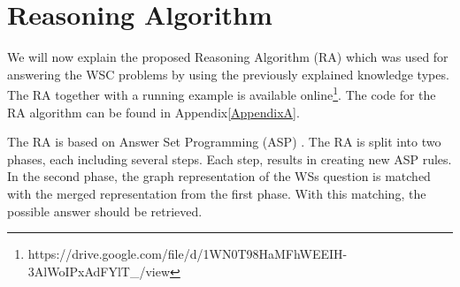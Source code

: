 \section{Reasoning Algorithm}
We will now explain the proposed Reasoning Algorithm (RA) which was used for answering the WSC problems by using the previously explained knowledge types. The RA together with a running example is available online\footnote{https://drive.google.com/file/d/1WN0T98HaMFhWEEIH-3AlWoIPxAdFYlT\_/view}. The code for the RA algorithm can be found in Appendix\ref{AppendixA}. 


The RA is based on Answer Set Programming (ASP) \cite{DBLP:conf/aaai/Lifschitz08}. 
The RA is split into two phases, each including several steps. Each step, results in creating new ASP rules.
In the second phase, the graph representation of the WSs question is matched with the merged representation from the first phase. With this matching, the possible answer should be retrieved. 

